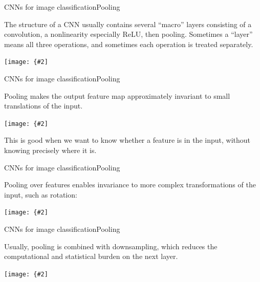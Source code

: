 \documentclass{beamer}
\newcommand{\myfig}[3]{\centerline{\texttt{[image: \{\#2]}}}
\begin{document}
\begin{frame}{CNNs for image classification}{Pooling}

The structure of a CNN usually contains several ``macro'' layers
consisting of a convolution, a nonlinearity especially ReLU, then
pooling. Sometimes a ``layer'' means all three operations, and sometimes
each operation is treated separately.

\myfig{2in}{goodfellow-fig9-7}{Goodfellow et al. (2016), Figure 9.7}

\end{frame}


\begin{frame}{CNNs for image classification}{Pooling}

Pooling makes the output feature map approximately \alert{invariant}
to small translations of the input.

\myfig{2in}{goodfellow-fig9-8}{Goodfellow et al. (2016), Figure 9.8}

This is good when we want to know \alert{whether} a feature is in the
input, without knowing precisely \alert{where} it is.

\end{frame}


\begin{frame}{CNNs for image classification}{Pooling}

Pooling \alert{over features} enables invariance to more complex
transformations of the input, such as rotation:
\myfig{3in}{goodfellow-fig9-9}{Goodfellow et al. (2016), Figure 9.9}

\end{frame}


\begin{frame}{CNNs for image classification}{Pooling}

Usually, pooling is combined with downsampling, which reduces the
computational and statistical burden on the next layer.

\medskip

\myfig{3in}{goodfellow-fig9-10}{Goodfellow et al. (2016), Figure 9.10}

\end{frame}
\end{document}
